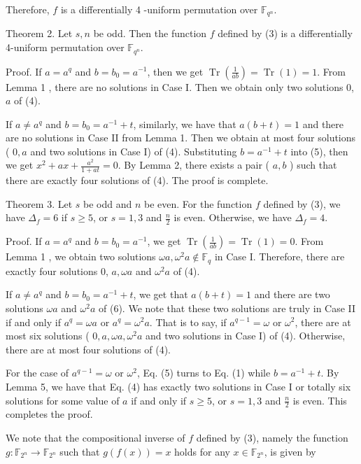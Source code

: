 \documentclass[10pt]{article}
\begin{document}
Therefore, $f$ is a differentially 4 -uniform permutation over $\mathbb{F}_{q^{n}}$.

Theorem 2. Let $s, n$ be odd. Then the function $f$ defined by (3) is a differentially 4-uniform permutation over $\mathbb{F}_{q^{n}}$.

Proof. If $a=a^{q}$ and $b=b_{0}=a^{-1}$, then we get $\operatorname{Tr}\left(\frac{1}{a b}\right)=\operatorname{Tr}(1)=1$. From Lemma 1 , there are no solutions in Case I. Then we obtain only two solutions 0, $a$ of (4).

If $a \neq a^{q}$ and $b=b_{0}=a^{-1}+t$, similarly, we have that $a(b+t)=1$ and there are no solutions in Case II from Lemma 1. Then we obtain at most four solutions ( $0, a$ and two solutions in Case I) of (4). Substituting $b=a^{-1}+t$ into (5), then we get $x^{2}+a x+\frac{a^{2}}{1+a t}=0$. By Lemma 2, there exists a pair ( $a, b$ ) such that there are exactly four solutions of (4). The proof is complete.

Theorem 3. Let $s$ be odd and $n$ be even. For the function $f$ defined by (3), we have $\Delta_{f}=6$ if $s \geqslant 5$, or $s=1,3$ and $\frac{n}{2}$ is even. Otherwise, we have $\Delta_{f}=4$.

Proof. If $a=a^{q}$ and $b=b_{0}=a^{-1}$, we get $\operatorname{Tr}\left(\frac{1}{a b}\right)=\operatorname{Tr}(1)=0$. From Lemma 1 , we obtain two solutions $\omega a, \omega^{2} a \notin \mathbb{F}_{q}$ in Case I. Therefore, there are exactly four solutions 0, $a, \omega a$ and $\omega^{2} a$ of (4).

If $a \neq a^{q}$ and $b=b_{0}=a^{-1}+t$, we get that $a(b+t)=1$ and there are two solutions $\omega a$ and $\omega^{2} a$ of (6). We note that these two solutions are truly in Case II if and only if $a^{q}=\omega a$ or $a^{q}=\omega^{2} a$. That is to say, if $a^{q-1}=\omega$ or $\omega^{2}$, there are at most six solutions ( $0, a, \omega a, \omega^{2} a$ and two solutions in Case I) of (4). Otherwise, there are at most four solutions of (4).

For the case of $a^{q-1}=\omega$ or $\omega^{2}$, Eq. (5) turns to Eq. (1) while $b=a^{-1}+t$. By Lemma 5, we have that Eq. (4) has exactly two solutions in Case I or totally six solutions for some value of $a$ if and only if $s \geqslant 5$, or $s=1,3$ and $\frac{n}{2}$ is even. This completes the proof.

We note that the compositional inverse of $f$ defined by (3), namely the function $g: \mathbb{F}_{2^{n}} \rightarrow \mathbb{F}_{2^{n}}$ such that $g(f(x))=x$ holds for any $x \in \mathbb{F}_{2^{n}}$, is given by
\end{document}
